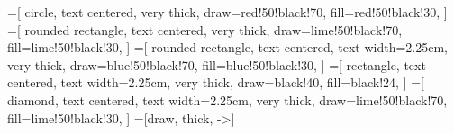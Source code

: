 \documentclass[ngerman]{scrartcl}
\begin{document}

=[
  circle,
  text centered,
  very thick,
  draw=red!50!black!70,
  fill=red!50!black!30,
  ]
=[
  rounded rectangle,
  text centered,
  very thick,
  draw=lime!50!black!70,
  fill=lime!50!black!30,
  ]
=[
  rounded rectangle,
  text centered,
  text width=2.25cm,
  very thick,
  draw=blue!50!black!70,
  fill=blue!50!black!30,
  ]
=[
  rectangle,
  text centered,
  text width=2.25cm,
  very thick,
  draw=black!40,
  fill=black!24,
  ]
=[
  diamond,
  text centered,
  text width=2.25cm,
  very thick,
  draw=lime!50!black!70,
  fill=lime!50!black!30,
  ]
=[draw, thick, ->]
\end{document}
